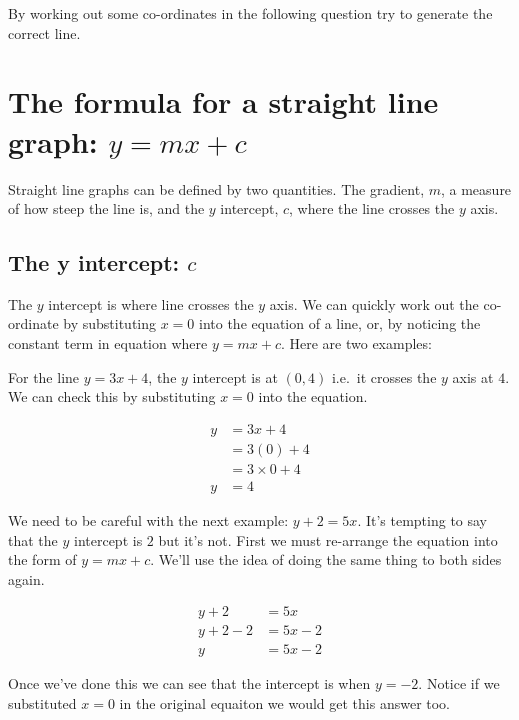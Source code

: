 \documentclass[
  a4paper,
]{scrbook}
\begin{document}
By working out some co-ordinates in the following question try to
generate the correct line.

\section{\texorpdfstring{The formula for a straight line graph:
\(y=mx+c\)}{The formula for a straight line graph: y=mx+c}}\label{the-formula-for-a-straight-line-graph-ymxc}

Straight line graphs can be defined by two quantities. The gradient,
\(m\), a measure of how steep the line is, and the \(y\) intercept,
\(c\), where the line crosses the \(y\) axis.

\subsection{\texorpdfstring{The y intercept:
\(c\)}{The y intercept: c}}\label{the-y-intercept-c}

The \(y\) intercept is where line crosses the \(y\) axis. We can quickly
work out the co-ordinate by substituting \(x=0\) into the equation of a
line, or, by noticing the constant term in equation where \(y=mx+c\).
Here are two examples:

For the line \(y = 3x +4\), the \(y\) intercept is at \((0,4)\) i.e.~it
crosses the \(y\) axis at \(4\). We can check this by substituting
\(x=0\) into the equation.

\[
\begin{aligned}
y &= 3x +4 \\
  &= 3(0) +4 \\
  &= 3\times0 +4 \\
y &= 4
\end{aligned}
\]

We need to be careful with the next example: \(y + 2 = 5x\). It's
tempting to say that the \(y\) intercept is \(2\) but it's not. First we
must re-arrange the equation into the form of \(y=mx+c\). We'll use the
idea of doing the same thing to both sides again.

\[
\begin{aligned}
y +2 &= 5x \\
 y+2-2 &= 5x-2 \\
 y &= 5x-2
\end{aligned}
\]

Once we've done this we can see that the intercept is when \(y=-2\).
Notice if we substituted \(x=0\) in the original equaiton we would get
this answer too.
\end{document}
